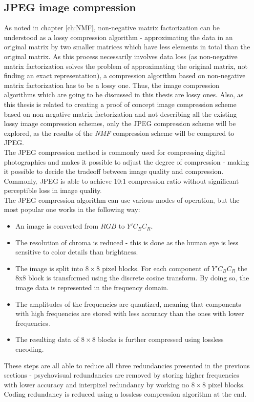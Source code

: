 \documentclass[thesis=M,english]{FITthesis}[2012/10/20]
\begin{document}
\subsection{JPEG image compression}
As noted in chapter \ref{ch:NMF}, non-negative matrix factorization can
be understood as a lossy compression algorithm - approximating the
data in an original matrix by two smaller matrices which have less
elements in total than the original matrix. As this process necessarily
involves data loss (as non-negative matrix factorization solves the problem
of approximating the original matrix, not finding an exact representation),
a compression algorithm based on non-negative matrix factorization has to be
a lossy one. Thus, the image compression algorithms which are going to be
discussed in this thesis are lossy ones. Also, as this thesis is related
to creating a proof of concept image compression scheme based on non-negative
matrix factorization and not describing all the existing lossy image
compression schemes, only the JPEG compression scheme will be explored,
as the results of the \emph{NMF} compression scheme will be compared to
JPEG.
\\

The JPEG compression method is commonly used for compressing digital
photographies and makes it possible to adjust the degree of compression
- making it possible to decide the tradeoff between image quality and
compression. Commonly, JPEG is able to achieve 10:1 compression ratio
without significant perceptible loss in image quality.\cite{jpegcompression}
\\

The JPEG compression algorithm can use various modes of operation, but
the most popular one works in the following way:
\begin{itemize}
    \item An image is converted from $RGB$ to $Y'C_BC_R$.
    \item The resolution of chroma is reduced - this is done as the human eye is less
    sensitive to color details than brightness.
    \item The image is split into $8 \times 8$ pixel blocks. For each component of $Y'C_BC_R$
    the 8x8 block is transformed using the discrete cosine transform. By doing so,
    the image data is represented in the frequency domain.
    \item The amplitudes of the frequencies are quantized, meaning that components
    with high frequencies are stored with less accuracy than the ones with lower
    frequencies.
    \item The resulting data of $8 \times 8$ blocks is further compressed using lossless
    encoding.
\end{itemize}
These steps are all able to reduce all three redundancies presented in the previous
sections - psychovisual redundancies are removed by storing higher frequencies with
lower accuracy and interpixel redundancy by working no $8 \times 8$ pixel blocks. Coding
redundancy is reduced using a lossless compression algorithm at the end.
\end{document}
